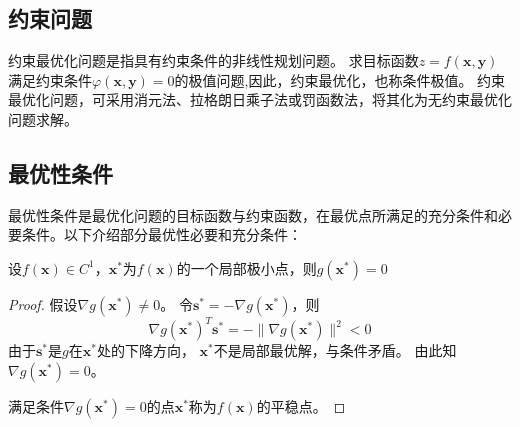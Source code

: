 \subsection{约束问题}

约束最优化问题是指具有约束条件的非线性规划问题。
求目标函数$z = f(\bm{x},\bm{y})$满足约束条件$\varphi(\bm{x},\bm{y}) = 0$的极值问题,因此，约束最优化，也称条件极值。
约束最优化问题，可采用消元法、拉格朗日乘子法或罚函数法，将其化为无约束最优化问题求解。

\subsection{最优性条件}\cite{Book1}
    最优性条件是最优化问题的目标函数与约束函数，在最优点所满足的充分条件和必要条件。以下介绍部分最优性必要和充分条件：
    \begin{theorem}[一阶必要条件]
        设$f(\bm{x})\in C^1$，$\bm{x}^*$为$f(\bm{x})$的一个局部极小点，则$g(\bm{x}^*)=0$
    \end{theorem}
    \begin{proof}
        假设$\nabla g(\bm{x}^*)\neq0$。
        令$\bm{s}^* = -\nabla g(\bm{x}^*)$，则
        \begin{equation*}
            \nabla g(\bm{x}^*)^T\bm{s}^* = - \|\nabla g(\bm{x}^*)\|^2 < 0
        \end{equation*}
        由于$\bm{s}^*$是$g$在$\bm{x}^*$处的下降方向，
        $\bm{x}^*$不是局部最优解，与条件矛盾。
        由此知$\nabla g(\bm{x}^*)=0$。

        满足条件$\nabla g(\bm{x}^*)=0$的点$\bm{x}^*$称为$f(\bm{x})$的平稳点。
    \end{proof}


